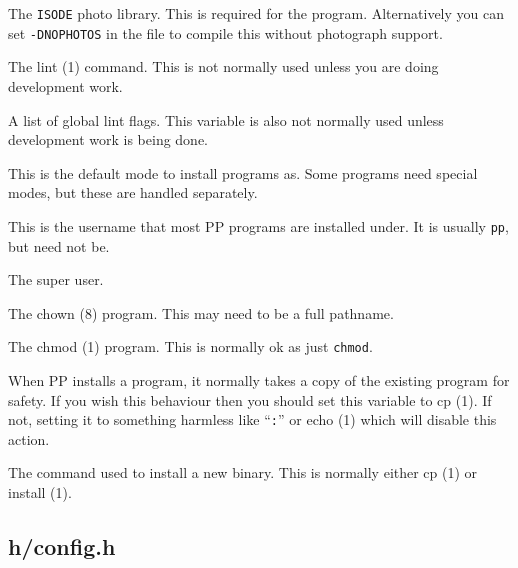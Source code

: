 \begin{describe}
\item[\verb|LIBPHOTO|:] The \verb|ISODE| photo
library. This is required for the  program. Alternatively
you can set \verb|-DNOPHOTOS| in the 
file to compile this without photograph support.

\item[\verb|LINT|:] The \man lint (1) command. This is not
normally used unless you are doing development work.

\item[\verb|LINTFLAGS|:] A list of global lint flags.
This variable is also not normally used unless development work is
being done.

\item[\verb|PGMPROT|:] This is the default mode to
install programs as. Some programs need special modes, but these are
handled separately.

\item[\verb|PPUSER|:] This is the username that most PP
programs are installed under. It is usually \verb|pp|, but need not
be.

\item[\verb|ROOTUSER|:] The super user.

\item[\verb|CHOWN|:] The \man chown (8) program. This may
need to be a full pathname.

\item[\verb|CHMOD|:] The \man chmod (1) program. This is
normally ok as just \verb|chmod|.

\item[\verb|BACKUP|:] When PP installs a program, it
normally takes a copy of the existing program for safety. If you wish
this behaviour then you should set this variable to \man cp (1). If
not, setting it to something harmless like ``\verb|:|'' or \man
echo (1) which will disable this action.

\item[\verb|INSTALL|:] The command used to install a
new binary. This is normally either \man cp (1) or \man install (1).
\end{describe}

\subsection {h/config.h}\label{config.h}

